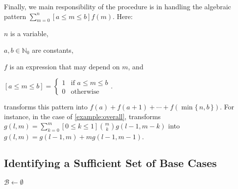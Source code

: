 \documentclass[letterpaper]{article} %
\theoremstyle{remark}
\theoremstyle{definition}
\begin{document}
Finally, we main responsibility of the \Simplify procedure is in handling the
algebraic pattern $\sum_{m=0}^{n}[a \le m \le b] f(m)$. Here:
\begin{enumerate*}[label=(\roman*)]
  \item $n$ is a variable,
  \item $a, b \in \mathbb{N}_{0}$ are constants,
  \item $f$ is an expression that may depend on $m$, and
  \item $[a \le m \le b] =
  \begin{cases}
    1 & \text{if $a \le m \le b$} \\
    0 & \text{otherwise}
  \end{cases}$.
\end{enumerate*}
\Simplify transforms this pattern into
$f(a) + f(a+1) + \cdots + f(\min\{\, n, b \,\})$. For instance, in the case of
\cref{example:overall}, \Simplify transforms
$g(l, m) = \sum_{k=0}^{m}[0 \le k \le 1]\binom{m}{k}g(l-1, m-k)$ into
$g(l, m) = g(l-1, m) + mg(l-1, m-1)$.

\subsection{Identifying a Sufficient Set of Base Cases}\label{sec:identifying}

\begin{algorithm}[t]
  \caption{\protect{}}\label{alg:findbasecases}

  $\mathcal{B} \gets \emptyset$\;
\end{algorithm}
\end{document}
